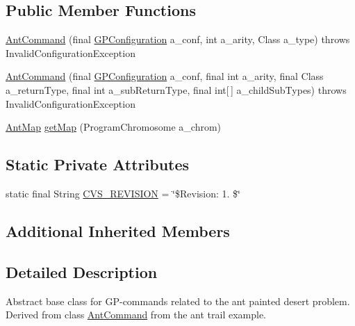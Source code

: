 \subsection*{Public Member Functions}
\begin{DoxyCompactItemize}
\item 
\hyperlink{classexamples_1_1gp_1_1painted_desert_1_1_ant_command_aa196d660703183d4f16587fb2af8d410}{Ant\-Command} (final \hyperlink{classorg_1_1jgap_1_1gp_1_1impl_1_1_g_p_configuration}{G\-P\-Configuration} a\-\_\-conf, int a\-\_\-arity, Class a\-\_\-type)  throws Invalid\-Configuration\-Exception 
\item 
\hyperlink{classexamples_1_1gp_1_1painted_desert_1_1_ant_command_aa3dfaada71cad97028a28f9cff7cd512}{Ant\-Command} (final \hyperlink{classorg_1_1jgap_1_1gp_1_1impl_1_1_g_p_configuration}{G\-P\-Configuration} a\-\_\-conf, final int a\-\_\-arity, final Class a\-\_\-return\-Type, final int a\-\_\-sub\-Return\-Type, final int\mbox{[}$\,$\mbox{]} a\-\_\-child\-Sub\-Types)  throws Invalid\-Configuration\-Exception 
\item 
\hyperlink{classexamples_1_1gp_1_1painted_desert_1_1_ant_map}{Ant\-Map} \hyperlink{classexamples_1_1gp_1_1painted_desert_1_1_ant_command_a667f3c05fddc4993282a33ca3ed0ab25}{get\-Map} (Program\-Chromosome a\-\_\-chrom)
\end{DoxyCompactItemize}
\subsection*{Static Private Attributes}
\begin{DoxyCompactItemize}
\item 
static final String \hyperlink{classexamples_1_1gp_1_1painted_desert_1_1_ant_command_ab621514a6470804ae5f933f1c7c5ade5}{C\-V\-S\-\_\-\-R\-E\-V\-I\-S\-I\-O\-N} = \char`\"{}\$Revision\-: 1. \$\char`\"{}
\end{DoxyCompactItemize}
\subsection*{Additional Inherited Members}


\subsection{Detailed Description}
Abstract base class for G\-P-\/commands related to the ant painted desert problem. Derived from class \hyperlink{classexamples_1_1gp_1_1painted_desert_1_1_ant_command}{Ant\-Command} from the ant trail example.

